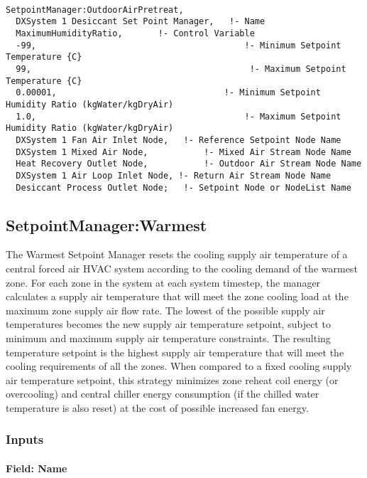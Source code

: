 \begin{lstlisting}

SetpointManager:OutdoorAirPretreat,
  DXSystem 1 Desiccant Set Point Manager,   !- Name
  MaximumHumidityRatio,       !- Control Variable
  -99,                                         !- Minimum Setpoint Temperature {C}
  99,                                           !- Maximum Setpoint Temperature {C}
  0.00001,                                 !- Minimum Setpoint Humidity Ratio (kgWater/kgDryAir)
  1.0,                                         !- Maximum Setpoint Humidity Ratio (kgWater/kgDryAir)
  DXSystem 1 Fan Air Inlet Node,   !- Reference Setpoint Node Name
  DXSystem 1 Mixed Air Node,           !- Mixed Air Stream Node Name
  Heat Recovery Outlet Node,           !- Outdoor Air Stream Node Name
  DXSystem 1 Air Loop Inlet Node, !- Return Air Stream Node Name
  Desiccant Process Outlet Node;   !- Setpoint Node or NodeList Name
\end{lstlisting}

\subsection{SetpointManager:Warmest}\label{setpointmanagerwarmest}

The Warmest Setpoint Manager resets the cooling supply air temperature of a central forced air HVAC system according to the cooling demand of the warmest zone. For each zone in the system at each system timestep, the manager calculates a supply air temperature that will meet the zone cooling load at the maximum zone supply air flow rate. The lowest of the possible supply air temperatures becomes the new supply air temperature setpoint, subject to minimum and maximum supply air temperature constraints. The resulting temperature setpoint is the highest supply air temperature that will meet the cooling requirements of all the zones. When compared to a fixed cooling supply air temperature setpoint, this strategy minimizes zone reheat coil energy (or overcooling) and central chiller energy consumption (if the chilled water temperature is also reset) at the cost of possible increased fan energy.

\subsubsection{Inputs}\label{inputs-10-018}

\paragraph{Field: Name}\label{field-name-10-015}

